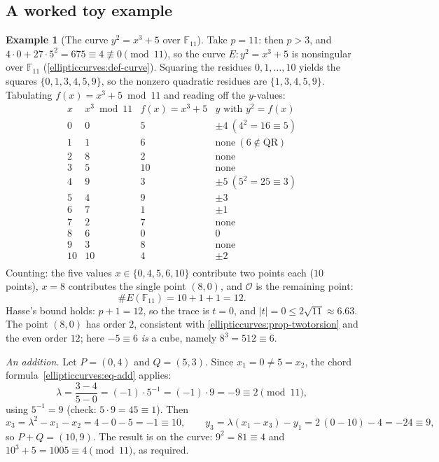 \documentclass[11pt,a4paper]{article}
\theoremstyle{definition}
\newtheorem{example}[theorem]{Example}
\theoremstyle{remark}
\newcommand{\F}{\ensuremath{\mathbb{F}}}
\providecommand{\abs}[1]{\lvert #1 \rvert}
\begin{document}
\subsection{A worked toy example}\label{ellipticcurves:subsec-toy}

\begin{example}[The curve \(y^2 = x^3 + 5\) over \(\F_{11}\)]
\label{ellipticcurves:exa-toy}
Take \(p = 11\): then \(p > 3\), and
\(4 \cdot 0 + 27 \cdot 5^2 = 675 \equiv 4 \not\equiv 0 \pmod{11}\), so
the curve \(E : y^2 = x^3 + 5\) is nonsingular over \(\F_{11}\)
(\cref{ellipticcurves:def-curve}). Squaring the residues
\(0, 1, \ldots, 10\) yields the squares
\(\{0, 1, 3, 4, 5, 9\}\), so the nonzero quadratic residues are
\(\{1, 3, 4, 5, 9\}\). Tabulating \(f(x) = x^3 + 5 \bmod 11\) and
reading off the \(y\)-values:
\[
\begin{array}{c|c|c|l}
  x & x^3 \bmod 11 & f(x) = x^3 + 5 & y \text{ with } y^2 = f(x) \\
  \hline
  0 & 0 & 5  & \pm 4 \ (4^2 = 16 \equiv 5) \\
  1 & 1 & 6  & \text{none} \ (6 \notin \mathrm{QR}) \\
  2 & 8 & 2  & \text{none} \\
  3 & 5 & 10 & \text{none} \\
  4 & 9 & 3  & \pm 5 \ (5^2 = 25 \equiv 3) \\
  5 & 4 & 9  & \pm 3 \\
  6 & 7 & 1  & \pm 1 \\
  7 & 2 & 7  & \text{none} \\
  8 & 6 & 0  & 0 \\
  9 & 3 & 8  & \text{none} \\
  10 & 10 & 4 & \pm 2 \\
\end{array}
\]
Counting: the five values \(x \in \{0, 4, 5, 6, 10\}\) contribute two
points each (\(10\) points), \(x = 8\) contributes the single point
\((8, 0)\), and \(\mathcal{O}\) is the remaining point:
\[
  \#E(\F_{11}) = 10 + 1 + 1 = 12 .
\]
Hasse's bound holds: \(p + 1 = 12\), so the trace is \(t = 0\), and
\(\abs{t} = 0 \leq 2\sqrt{11} \approx 6.63\). The point
\((8, 0)\) has order \(2\), consistent with
\cref{ellipticcurves:prop-twotorsion} and the even order \(12\); here
\(-5 \equiv 6\) \emph{is} a cube, namely \(8^3 = 512 \equiv 6\).

\smallskip
\emph{An addition.} Let \(P = (0, 4)\) and \(Q = (5, 3)\). Since
\(x_1 = 0 \neq 5 = x_2\), the chord
formula~\eqref{ellipticcurves:eq-add} applies:
\[
  \lambda = \frac{3 - 4}{5 - 0} = (-1) \cdot 5^{-1}
  = (-1) \cdot 9 = -9 \equiv 2 \pmod{11},
\]
using \(5^{-1} = 9\) (check: \(5 \cdot 9 = 45 \equiv 1\)). Then
\[
  x_3 = \lambda^2 - x_1 - x_2 = 4 - 0 - 5 = -1 \equiv 10, \qquad
  y_3 = \lambda(x_1 - x_3) - y_1 = 2\,(0 - 10) - 4 = -24 \equiv 9 ,
\]
so \(P + Q = (10, 9)\). The result is on the curve:
\(9^2 = 81 \equiv 4\) and \(10^3 + 5 = 1005 \equiv 4 \pmod{11}\), as
required.


\end{example}
\end{document}
